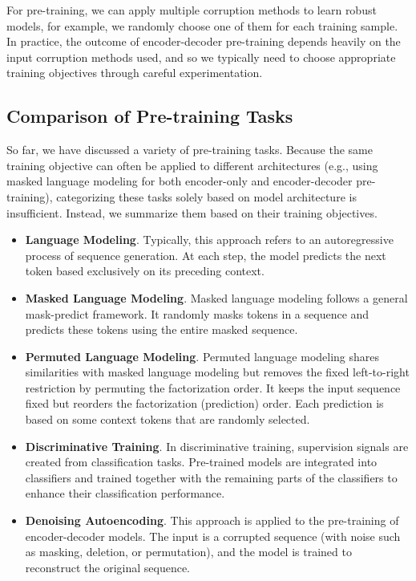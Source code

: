 For pre-training, we can apply multiple corruption methods to learn robust models, for example, we randomly choose one of them for each training sample. In practice, the outcome of encoder-decoder pre-training depends heavily on the input corruption methods used, and so we typically need to choose appropriate training objectives through careful experimentation.

\subsection{Comparison of Pre-training Tasks}

\noindent So far, we have discussed a variety of pre-training tasks. Because the same training objective can often be applied to different architectures (e.g., using masked language modeling for both encoder-only and encoder-decoder pre-training), categorizing these tasks solely based on model architecture is insufficient. Instead, we summarize them based on their training objectives.

\begin{itemize}
\item \vspace{0.5em} \textbf{Language Modeling}. Typically, this approach refers to an autoregressive process of sequence generation. At each step, the model predicts the next token based exclusively on its preceding context.
\item \vspace{0.3em} \textbf{Masked Language Modeling}. Masked language modeling follows a general mask-predict framework. It randomly masks tokens in a sequence and predicts these tokens using the entire masked sequence.
\item \vspace{0.3em} \textbf{Permuted Language Modeling}. Permuted language modeling shares similarities with masked language modeling but removes the fixed left-to-right restriction by permuting the factorization order. It keeps the input sequence fixed but reorders the factorization (prediction) order. Each prediction is based on some context tokens that are randomly selected.
\item \vspace{0.3em} \textbf{Discriminative Training}. In discriminative training, supervision signals are created from classification tasks. Pre-trained models are integrated into classifiers and trained together with the remaining parts of the classifiers to enhance their classification performance.
\item \vspace{0.3em} \textbf{Denoising Autoencoding}. This approach is applied to the pre-training of encoder-decoder models. The input is a corrupted sequence (with noise such as masking, deletion, or permutation), and the model is trained to reconstruct the original sequence.
\end{itemize}
\vspace{0.5em}

